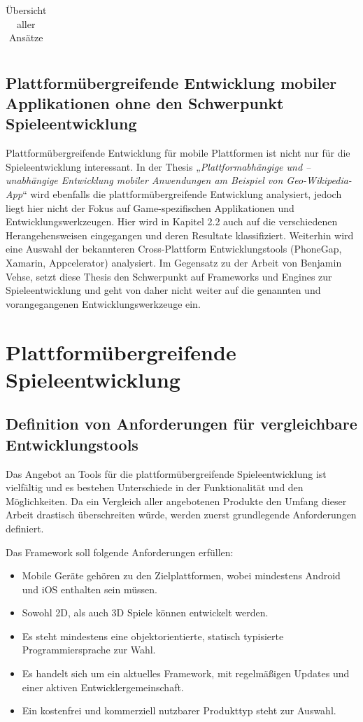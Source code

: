 \begin{table}[htbp]
{\begin{tabular}{|c|c|p{8cm}|p{6cm}|p{}|}
		\end{tabular}
	}
	\caption{Übersicht aller Ansätze}
	\label{table_all_approaches}
\end{table}

\section{Plattformübergreifende Entwicklung mobiler Applikationen ohne den Schwerpunkt Spieleentwicklung}
Plattformübergreifende Entwicklung für mobile Plattformen ist nicht nur für die Spieleentwicklung interessant.
In der Thesis „\textit{Plattformabhängige und –unabhängige Entwicklung mobiler Anwendungen am Beispiel von Geo-Wikipedia-App}“ \citep{cross_plattform_development_vehse} wird ebenfalls die plattformübergreifende Entwicklung analysiert, jedoch liegt hier nicht der Fokus auf Game-spezifischen Applikationen und Entwicklungswerkzeugen. Hier wird in Kapitel 2.2 auch auf die verschiedenen Herangehensweisen eingegangen und deren Resultate klassifiziert. Weiterhin wird eine Auswahl der bekannteren Cross-Plattform Entwicklungstools (PhoneGap, Xamarin, Appcelerator) analysiert. Im Gegensatz zu der Arbeit von Benjamin Vehse, setzt diese Thesis den Schwerpunkt auf Frameworks und Engines zur Spieleentwicklung und geht von daher nicht weiter auf die genannten und vorangegangenen Entwicklungswerkzeuge ein.


\chapter{Plattformübergreifende Spieleentwicklung}

\section{Definition von Anforderungen für vergleichbare Entwicklungstools}
Das Angebot an Tools für die plattformübergreifende Spieleentwicklung ist vielfältig und es bestehen Unterschiede in der Funktionalität und den Möglichkeiten. Da ein Vergleich aller angebotenen Produkte den Umfang dieser Arbeit drastisch überschreiten würde, werden zuerst grundlegende Anforderungen definiert.
 
\bigskip
Das Framework soll folgende Anforderungen erfüllen:
\begin{itemize}
	\item Mobile Geräte gehören zu den Zielplattformen, wobei mindestens Android und iOS enthalten sein müssen.
	\item Sowohl 2D, als auch 3D Spiele können entwickelt werden.
	\item Es steht mindestens eine objektorientierte, statisch typisierte Programmiersprache zur Wahl.
	\item Es handelt sich um ein aktuelles Framework, mit regelmäßigen Updates und einer aktiven Entwicklergemeinschaft.
	\item Ein kostenfrei und kommerziell nutzbarer Produkttyp steht zur Auswahl.
\end{itemize}

